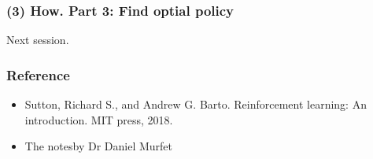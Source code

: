 \documentclass[10pt]{beamer}
\theoremstyle{remark}
\begin{document}
\begin{frame}
    \frametitle{(3) How. Part 3: Find optial policy}
    Next session.
\end{frame}

\begin{frame}
    \frametitle{Reference}
    \begin{itemize}
        \item Sutton, Richard S., and Andrew G. Barto. Reinforcement learning: An introduction. MIT press, 2018.
        \item The notes\footnotemark by Dr Daniel Murfet
    \end{itemize}
\end{frame}
\end{document}

